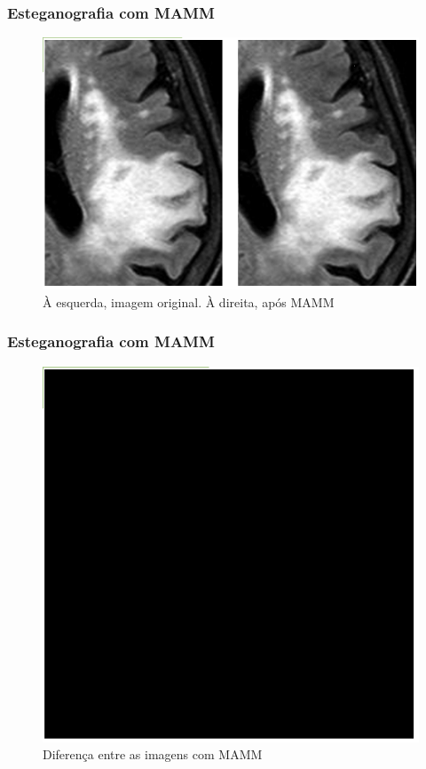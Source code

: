 \documentclass{beamer}
\begin{document}
\begin{frame}
\frametitle{Esteganografia com MAMM}
\begin{figure}
\includegraphics[scale=.2]{MAMM.png} 
\caption{À esquerda, imagem original. À direita, após MAMM}
\end{figure}
\end{frame}

\begin{frame}
\frametitle{Esteganografia com MAMM}
\begin{figure}
\includegraphics[scale=.2]{MAMMdiff.png} 
\caption{Diferença entre as imagens com MAMM}
\end{figure}
\end{frame}
\end{document}
